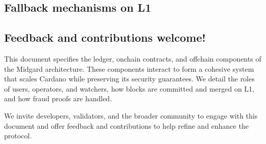 \documentclass[../midgard.tex]{subfiles}
\begin{document}
\subsection*{Fallback mechanisms on L1}

\todo

\subsection*{Feedback and contributions welcome!}
\label{h:feedback-and-contributions-welcome}

This document specifies the ledger, onchain contracts, and offchain components of the Midgard architecture.
These components interact to form a cohesive system that scales Cardano while preserving its security guarantees.
We detail the roles of users, operators, and watchers, how blocks are committed and merged on L1, and how fraud proofs are handled.

We invite developers, validators, and the broader community to engage with this document and offer feedback and contributions to help refine and enhance the protocol.
\end{document}
